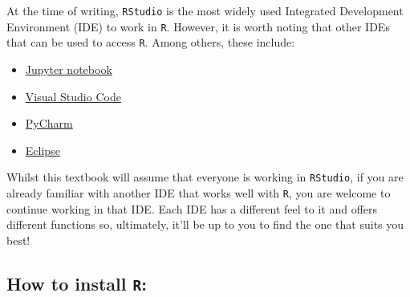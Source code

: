 \documentclass[
  letterpaper,
  DIV=11,
  numbers=noendperiod,
  oneside]{scrreprt}
\begin{document}
\begin{tcolorbox}[enhanced jigsaw, colframe=quarto-callout-note-color-frame, breakable, opacityback=0, leftrule=.75mm, title=\textcolor{quarto-callout-note-color}{\faInfo}\hspace{0.5em}{Using other IDEs to work in R}, colbacktitle=quarto-callout-note-color!10!white, toptitle=1mm, bottomrule=.15mm, rightrule=.15mm, coltitle=black, colback=white, bottomtitle=1mm, titlerule=0mm, opacitybacktitle=0.6, toprule=.15mm, arc=.35mm, left=2mm]

At the time of writing, \texttt{RStudio} is the most widely used
Integrated Development Environment (IDE) to work in \texttt{R}. However,
it is worth noting that other IDEs that can be used to access
\texttt{R}. Among others, these include:

\begin{itemize}
\item
  \href{https://jupyter.org/}{Jupyter notebook}
\item
  \href{https://code.visualstudio.com/}{Visual Studio Code}
\item
  \href{https://www.jetbrains.com/pycharm/}{PyCharm}
\item
  \href{https://eclipseide.org/}{Eclipse}
\end{itemize}

Whilst this textbook will assume that everyone is working in
\texttt{RStudio}, if you are already familiar with another IDE that
works well with \texttt{R}, you are welcome to continue working in that
IDE. Each IDE has a different feel to it and offers different functions
so, ultimately, it'll be up to you to find the one that suits you best!

\end{tcolorbox}

\subsection{\texorpdfstring{How to install
\texttt{R}:}{How to install R:}}\label{how-to-install-r}
\end{document}

